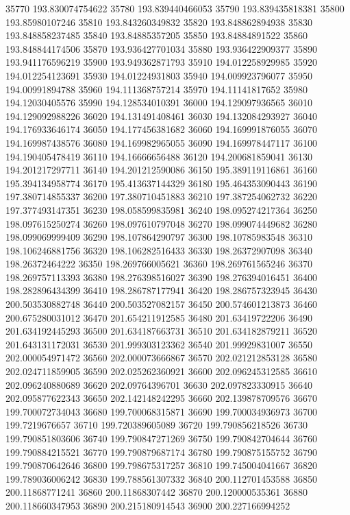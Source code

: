 {35770 193.830074754622
35780 193.839440466053
35790 193.839435818381
35800 193.85980107246
35810 193.843260349832
35820 193.848862894938
35830 193.848858237485
35840 193.84885357205
35850 193.84884891522
35860 193.848844174506
35870 193.936427701034
35880 193.936422909377
35890 193.941176596219
35900 193.949362871793
35910 194.012258929985
35920 194.012254123691
35930 194.01224931803
35940 194.009923796077
35950 194.00991894788
35960 194.111368757214
35970 194.11141817652
35980 194.12030405576
35990 194.128534010391
36000 194.129097936565
36010 194.129092988226
36020 194.131491408461
36030 194.132084293927
36040 194.176933646174
36050 194.177456381682
36060 194.169991876055
36070 194.169987438576
36080 194.169982965055
36090 194.169978447117
36100 194.190405478419
36110 194.16666656488
36120 194.200681859041
36130 194.201217297711
36140 194.201212590086
36150 195.389119116861
36160 195.394134958774
36170 195.413637144329
36180 195.464353090443
36190 197.380714855337
36200 197.380710451883
36210 197.387254062732
36220 197.377493147351
36230 198.058599835981
36240 198.095274217364
36250 198.097615250274
36260 198.097610797048
36270 198.099074449682
36280 198.099069999409
36290 198.107864290797
36300 198.10785983548
36310 198.106246881756
36320 198.106282516433
36330 198.26372907098
36340 198.26372464222
36350 198.269766005621
36360 198.269761565246
36370 198.269757113393
36380 198.276398516027
36390 198.276394016451
36400 198.282896434399
36410 198.286787177941
36420 198.286757323945
36430 200.503530882748
36440 200.503527082157
36450 200.574601213873
36460 200.675280031012
36470 201.654211912585
36480 201.63419722206
36490 201.634192445293
36500 201.634187663731
36510 201.634182879211
36520 201.643131172031
36530 201.999303123362
36540 201.99929831007
36550 202.000054971472
36560 202.000073666867
36570 202.021212853128
36580 202.024711859905
36590 202.025262360921
36600 202.096245312585
36610 202.096240880689
36620 202.09764396701
36630 202.097823330915
36640 202.095877622343
36650 202.142148242295
36660 202.139878709576
36670 199.700072734043
36680 199.700068315871
36690 199.700034936973
36700 199.7219676657
36710 199.720389605089
36720 199.790856218526
36730 199.790851803606
36740 199.790847271269
36750 199.790842704644
36760 199.790884215521
36770 199.790879687174
36780 199.790875155752
36790 199.790870642646
36800 199.798675317257
36810 199.745004041667
36820 199.789036006242
36830 199.788561307332
36840 200.112701453588
36850 200.11868771241
36860 200.11868307442
36870 200.120000535361
36880 200.118660347953
36890 200.215180914543
36900 200.227166994252
}
